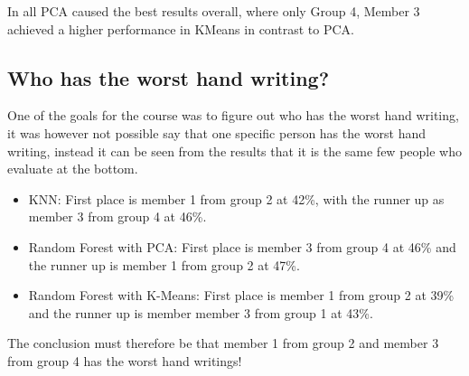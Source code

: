 \documentclass[report]{subfiles}
\begin{document}
In all PCA caused the best results overall, where only Group 4, Member 3 achieved a higher performance in KMeans in contrast to PCA.

\subsection{Who has the worst hand writing?}
One of the goals for the course was to figure out who has the worst hand writing, it was however not possible say that one specific person has the worst hand writing, instead it can be seen from the results that it is the same few people who evaluate at the bottom.
\begin{itemize}
	\item KNN: First place is member 1 from group 2 at 42\%, with the runner up as member 3 from group 4 at 46\%.
	\item Random Forest with PCA: First place is member 3 from group 4 at 46\% and the runner up is member 1 from group 2 at 47\%.
	\item Random Forest with K-Means: First place is member 1 from group 2 at 39\% and the runner up is member member 3 from group 1 at 43\%.
\end{itemize}
The conclusion must therefore be that member 1 from group 2 and member 3 from group 4 has the worst hand writings!
\end{document}
